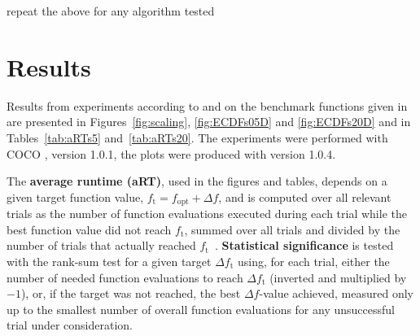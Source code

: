 \documentclass{sig-alternate}
\newcommand{\Df}{\ensuremath{\Delta f}}
\newcommand{\fopt}{\ensuremath{f_\mathrm{opt}}}
\newcommand{\ftarget}{\ensuremath{f_\mathrm{t}}}
\newcommand{\change}[1]{{\color{red} #1}}
\begin{document}
\change{repeat the above for any algorithm tested}


\section{Results}

Results from experiments according to \cite{hansen2016exp} and \cite{hansen2016perfass} on the
benchmark functions given in \cite{wp200901_2010,hansen2012fun} are
presented in Figures~\ref{fig:scaling}, \ref{fig:ECDFs05D} and
\ref{fig:ECDFs20D} and in Tables~\ref{tab:aRTs5} and~\ref{tab:aRTs20}.
The experiments were performed with COCO \cite{hansen2016cocoplat}, version
\change{1.0.1}, the plots were produced with version \change{1.0.4}.

The \textbf{average runtime (aRT)}, used in the figures and tables,
depends on a given target function value, $\ftarget=\fopt+\Df$, and is
computed over all relevant trials as the number of function
evaluations executed during each trial while the best function value
did not reach \ftarget, summed over all trials and divided by the
number of trials that actually reached \ftarget\
\cite{hansen2012exp,price1997dev}.  \textbf{Statistical significance}
is tested with the rank-sum test for a given target $\Delta\ftarget$
using, for each trial,
either the number of needed function evaluations to reach
$\Delta\ftarget$ (inverted and multiplied by $-1$), or, if the target
was not reached, the best $\Df$-value achieved, measured only up to
the smallest number of overall function evaluations for any
unsuccessful trial under consideration.



\end{document}
